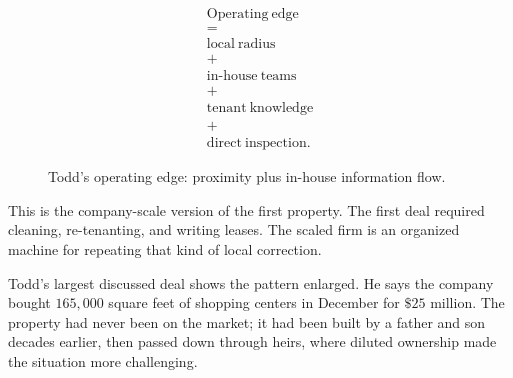 \documentclass[11pt,oneside]{book}
\begin{document}
\begin{equation}
\begin{gathered}
\mathrm{Operating\ edge}\\
=\\
\mathrm{local\ radius}\\
+\\
\mathrm{in\mbox{-}house\ teams}\\
+\\
\mathrm{tenant\ knowledge}\\
+\\
\mathrm{direct\ inspection}.
\end{gathered}
\end{equation}

\begin{figure}
\centering
{}
\caption{Todd's operating edge: proximity plus in-house information flow.}
\end{figure}

This is the company-scale version of the first property. The first deal required cleaning, re-tenanting, and writing leases. The scaled firm is an organized machine for repeating that kind of local correction.

Todd's largest discussed deal shows the pattern enlarged. He says the company bought \(165{,}000\) square feet of shopping centers in December for \(\$25\) million. The property had never been on the market; it had been built by a father and son decades earlier, then passed down through heirs, where diluted ownership made the situation more challenging.
\end{document}
